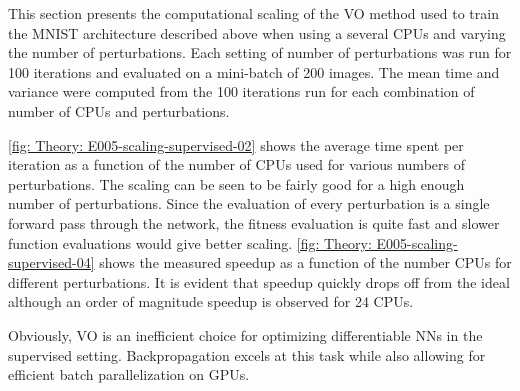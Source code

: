 This section presents the computational scaling of the \gls{VO} method used to train the \gls{MNIST} architecture described above when using a several \glspl{CPU} and varying the number of perturbations. 
Each setting of number of perturbations was run for 100 iterations and evaluated on a mini-batch of 200 images.
The mean time and variance were computed from the 100 iterations run for each combination of number of \glspl{CPU} and perturbations.

\autoref{fig: Theory: E005-scaling-supervised-02} shows the average time spent per iteration as a function of the number of \glspl{CPU} used for various numbers of perturbations. The scaling can be seen to be fairly good for a high enough number of perturbations. Since the evaluation of every perturbation is a single forward pass through the network, the fitness evaluation is quite fast and slower function evaluations would give better scaling. \autoref{fig: Theory: E005-scaling-supervised-04} shows the measured speedup as a function of the number \glspl{CPU} for different perturbations. %
It is evident that speedup quickly drops off from the ideal although an order of magnitude speedup is observed for 24 \glspl{CPU}.

Obviously, \gls{VO} is an inefficient choice for optimizing differentiable \glspl{NN} in the supervised setting. Backpropagation excels at this task while also allowing for efficient batch parallelization on \glspl{GPU}.

